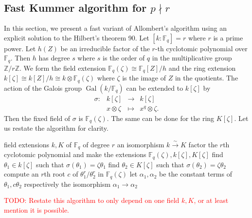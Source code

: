 \documentclass[12pt]{article}
\theoremstyle{plain}
\theoremstyle{definition}
\newcommand{\todo}[1]{\textcolor{red}{TODO: #1}}
\DeclareMathOperator{\gal}{Gal} %
\def\Z{\ensuremath{\mathbb{Z}}}
\def\F{\ensuremath{\mathbb{F}}}
\newcounter{algorithm}
\begin{document}
\subsection{Fast Kummer algorithm for $p \nmid r$}
\label{sec:fast-kummer}

In this section, we present a fast variant of Allombert's algorithm using an explicit solution to 
the Hilbert's theorem 90. Let $[k: \F_q] = r$ where $r$ is a prime power. Let $h(Z)$ be an 
irreducible factor of the $r$-th cyclotomic polynomial over $\F_q$. Then $h$ has degree $s$ where 
$s$ is the order of $q$ in the multiplicative group $\Z/r\Z$. We form the field extension 
$\F_q(\zeta) \cong \F_q[Z] / h$ and the ring extension $k[\zeta] \cong k[Z] / h \cong k \otimes 
\F_q(\zeta)$ where $\zeta$ is the image of $Z$ in the quotients. The action of the Galois group 
$\gal(k / \F_q)$ can be extended to $k[\zeta]$ by
\[
\begin{array}{llll}
\sigma: & k[\zeta] & \rightarrow & k[\zeta] \\
& x \otimes \zeta & \mapsto & x^q \otimes \zeta.
\end{array}
\]
Then the fixed field of $\sigma$ is $\F_q(\zeta)$. The same can be done for the ring $K[\zeta]$. 
Let us restate the algorithm for clarity.

\begin{algorithm}[Allombert]
	\begin{algorithmic}[1]
		\REQUIRE field extensions $k, K$ of $\F_q$ of degree $r$
		\ENSURE an isomorphism $k \xrightarrow{\sim} K$
		\STATE factor the $r$th cyclotomic polynomial and make the extensions $\F_q(\zeta), 
		k[\zeta], K[\zeta]$
		\STATE find $\theta_1 \in k[\zeta]$ such that $\sigma(\theta_1) = \zeta\theta_1$
		\STATE find $\theta_2 \in K[\zeta]$ such that $\sigma(\theta_2) = \zeta\theta_2$
		\STATE compute an $r$th root $c$ of $\theta_1^r / \theta_2^r$ in $\F_q(\zeta)$
		\STATE let $\alpha_1, \alpha_2$ be the constant terms of $\theta_1, c\theta_2$ respectively
		\RETURN the isomorphism $\alpha_1 \rightarrow \alpha_2$
	\end{algorithmic}
\end{algorithm}

\todo{Restate this algorithm to only depend on one field $k,K$, or at
  least mention it is possible.}
\end{document}
